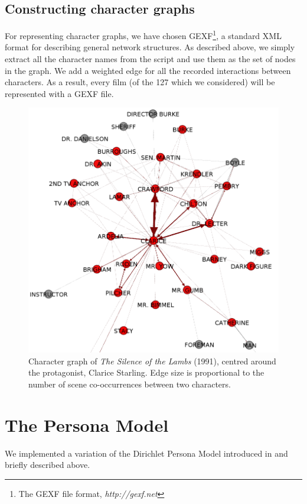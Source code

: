 \documentclass[bsc,frontabs,singlespacing,parskip]{infthesis} %
\begin{document}
\subsection{Constructing character graphs}
For representing character graphs, we have chosen GEXF\footnote{The GEXF file format, \textit{http://gexf.net}}, a standard XML format for describing general network structures. As described above, we simply extract all the character names from the script and use them as the set of nodes in the graph. We add a weighted edge for all the recorded interactions between characters. As a result, every film (of the 127 which we considered) will be represented with a GEXF file.

\begin{figure}
	\centering
	\includegraphics[scale=0.4]{figures/clarice_graph}
	\caption{Character graph of \textit{The Silence of the Lambs} (1991), centred around the protagonist, Clarice Starling. Edge size is proportional to the number of scene co-occurrences between two characters.}
\end{figure}

\section{The Persona Model}
We implemented a variation of the Dirichlet Persona Model introduced in \cite{Bamman2013} and briefly described above.
\end{document}
